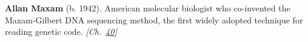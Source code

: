 \textbf{Allan Maxam} (b. 1942). American molecular biologist who co-invented the Maxam-Gilbert DNA sequencing method, the first widely adopted technique for reading genetic code. \emph{[Ch.~\hyperref[ch:dnasequencing]{40}]}

